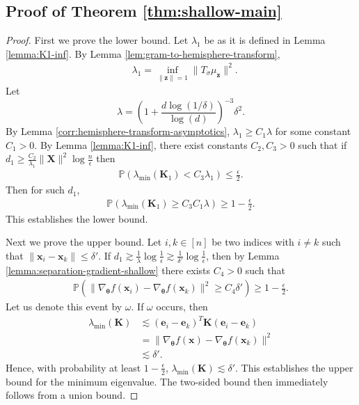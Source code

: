 \documentclass{article}
\theoremstyle{definition}
\renewcommand{\P}{\mathbb{P}}
\def\vtheta{{\bm{\theta}}}
\def\ve{{\bm{e}}}
\def\vx{{\bm{x}}}
\def\vz{{\bm{z}}}
\def\mK{{\bm{K}}}
\def\mX{{\bm{X}}}
\begin{document}
\subsection{Proof of Theorem \ref{thm:shallow-main}}\label{app:shallow-main}


\ThmShallowMain*

\begin{proof} 
    First we prove the lower bound. Let $\lambda_1$ be as it is defined in Lemma \ref{lemma:K1-inf}. By Lemma \ref{lem:gram-to-hemisphere-transform},
     \begin{align*}
     &\lambda_1 = \inf_{\| \vz \| = 1} \| T_{\dot{\sigma}} \mu_{\vz} \|^2.
     \end{align*}
     Let
     \[
     \lambda = \left( 1 + \frac{d\log(1/\delta)}{\log(d)} \right)^{-3} \delta^2.
    \]
    By Lemma \ref{corr:hemisphere-transform-asymptotics}, $\lambda_1 \geq C_1\lambda$ for some constant $C_1 > 0$. By Lemma \ref{lemma:K1-inf}, there exist constants $C_2, C_3 > 0$ such that if $d_1 \geq \frac{C_2}{\lambda_1}\|\mX\|^2 \log \frac{n}{\epsilon}$ then
    \begin{align}
        \P(\lambda_{\min}(\mK_1) < C_3 \lambda_1) \leq \frac{\epsilon}{2}.\label{eqn:C3lambda1-conditional}
    \end{align}
    Then for such $d_1$,
    \begin{align*}
        \P(\lambda_{\min}(\mK_1) \geq C_3C_1 \lambda) \geq 1 - \frac{\epsilon}{2}.
    \end{align*}
    This establishes the lower bound.

    Next we prove the upper bound. Let $i, k \in [n]$ be two indices with $i \neq k$ such that $\|\vx_i - \vx_k\| \leq \delta'$. If $d_1 \gtrsim \frac{1}{\lambda}\log \frac{1}{\epsilon} \gtrsim \frac{1}{\delta'} \log \frac{1}{\epsilon}$, then by Lemma \ref{lemma:separation-gradient-shallow} there exists $C_4 > 0$ such that
    \begin{align*}
        \P(\|\nabla_{\vtheta}f(\vx_i)  - \nabla_{\vtheta}f(\vx_k)\|^2 \geq C_4\delta') \geq 1 - \frac{\epsilon}{2}.
    \end{align*}
    Let us denote this event by $\omega$. If $\omega$ occurs, then
    \begin{align*}
        \lambda_{\min}(\mK) &\lesssim (\ve_i - \ve_k)^T \mK (\ve_i - \ve_k)\\
        &= \| \nabla_{\vtheta}f(\vx) - \nabla_{\vtheta}f(\vx_k)\|^2\\
        &\lesssim \delta'.
    \end{align*}
    Hence, with probability at least $1 - \frac{\epsilon}{2}$, $\lambda_{\min}(\mK) \lesssim \delta'$. This establishes the upper bound for the minimum eigenvalue. The two-sided bound then immediately follows from a union bound.
\end{proof}
\end{document}
